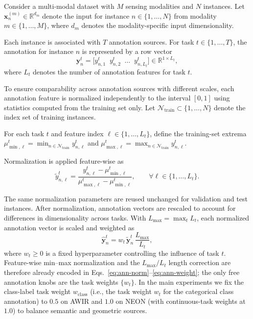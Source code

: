 \documentclass[10pt,twocolumn,letterpaper]{article}
\renewcommand{\red}[1]{#1}
\begin{document}
Consider a multi-modal dataset with $M$ sensing modalities and $N$ instances.
Let $\mathbf{x}_n^{(m)} \in \mathbb{R}^{d_m}$ denote the input for instance
$n \in \{1,\dots,N\}$ from modality $m \in \{1,\dots,M\}$, where $d_m$
denotes the modality-specific input dimensionality.

Each instance is associated with $T$ annotation sources.
For task $t \in \{1,\dots,T\}$, the annotation for instance $n$ is represented
by a row vector
\[
\mathbf{y}^{t}_{n}
=
\big[
y^{t}_{n,1}\;\; y^{t}_{n,2}\;\; \dots\;\; y^{t}_{n,L_t}
\big]
\in \mathbb{R}^{1 \times L_t},
\]
where $L_t$ denotes the number of annotation features for task $t$.

To ensure comparability across annotation sources with different scales,
each annotation feature is normalized independently to the interval $[0,1]$
using statistics computed from the training set only.
Let $\mathcal{N}_{\mathrm{train}} \subset \{1,\dots,N\}$ denote the index set of
training instances.

For each task $t$ and feature index $\ell \in \{1,\dots,L_t\}$, define the training-set extrema $\mu^{t}_{\min,\ell}=\min_{n \in \mathcal{N}_{\mathrm{train}}} y^{t}_{n,\ell}$ and $\mu^{t}_{\max,\ell}=\max_{n \in \mathcal{N}_{\mathrm{train}}} y^{t}_{n,\ell}$.

\noindent Normalization is applied feature-wise as
\begin{equation}
\label{eq:ann-norm}
\tilde{y}^{t}_{n,\ell}
=
\frac{
y^{t}_{n,\ell}
-
\mu^{t}_{\min,\ell}
}{
\mu^{t}_{\max,\ell}
-
\mu^{t}_{\min,\ell}
},
\qquad
\forall \ell \in \{1,\dots,L_t\}.
\end{equation}

\noindent The same normalization parameters are reused unchanged for validation and test instances. After normalization, annotation vectors are rescaled to account for differences in dimensionality across tasks. With $L_{\max} = \max_{t} L_t$, each normalized annotation vector is scaled and weighted as
\begin{equation}
\label{eq:ann-weight}
\hat{\mathbf{y}}^{t}_{n}
=
w_t \, \tilde{\mathbf{y}}^{t}_{n}\, \frac{L_{\max}}{L_t},
\end{equation}
where $w_t \ge 0$ is a fixed hyperparameter controlling the influence of task $t$. Feature-wise min--max normalization and the $L_{\max}/L_t$ length correction are therefore already encoded in Eqs.~\eqref{eq:ann-norm}--\eqref{eq:ann-weight}; the only free annotation knobs are the task weights $\{w_t\}$. \red{In the main experiments we fix the class-label task weight $w_{\text{class}}$ (i.e., the task weight $w_t$ for the categorical class annotation) to $0.5$ on AWIR and $1.0$ on NEON (with continuous-task weights at $1.0$) to balance semantic and geometric sources.}
\end{document}
